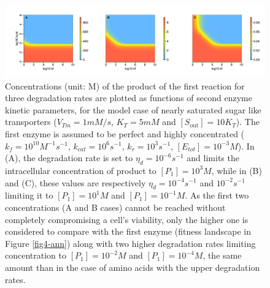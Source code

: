 \begin{figure}[htb!]
\centering
\includegraphics[scale=0.46,trim=1cm 0cm 0cm 1cm,clip]{pics/SM-Enzymes/2DConcentrationLandscape_degratesHF.jpeg} 
\vspace{-0.3cm}
\caption{Concentrations (unit: M) of the product of the first reaction for three degradation rates are plotted as functions of second enzyme kinetic parameters, for the model case of nearly saturated sugar like transporters ($\displaystyle V_{Tm}=1 mM/s$, $\displaystyle K_T=5 mM$ and $\displaystyle [S_\text{out}]=10K_T$). The first enzyme is assumed to be perfect and highly concentrated ($k_f=10^{10}M^{-1}s^{-1}$, $k_{cat}=10^6s^{-1}$, $k_r=10^3s^{-1}$, $[E_{tot}]=10^{-3}M$). In (A), the degradation rate is set to $\eta_d=10^{-6}s^{-1}$ and limits the intracellular concentration of product to $[P_{1}]=10^3M$, while in (B) and (C), these values are respectively $\eta_d=10^{-4}s^{-1}$ and $10^{-2}s^{-1}$ limiting it to $[P_{1}]=10^{1}M$ and $[P_{1}]=10^{-1}M$. As the first two concentrations (A and B cases) cannot be reached without completely compromising a cell's viability, only the higher one is considered to compare with the first enzyme (fitness landscape in Figure \ref{fig4-ann}) along with two higher degradation rates limiting concentration to $[P_{1}]=10^{-2}M$ and $[P_{1}]=10^{-4}M$, the same amount than in the case of amino acids with the upper degradation rates.}
\label{fig4a-ann}
\end{figure}

